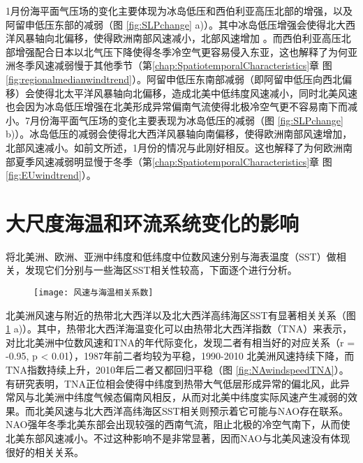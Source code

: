 1月份海平面气压场的变化主要体现为冰岛低压和西伯利亚高压北部的增强，以及阿留申低压东部的减弱（图 \ref{fig:SLPchange} a)）。其中冰岛低压增强会使得北大西洋风暴轴向北偏移，使得欧洲南部风速减小，北部风速增加 \citep{lifland2003the}。而西伯利亚高压北部增强配合日本以北气压下降使得冬季冷空气更容易侵入东亚，这也解释了为何亚洲冬季风速减弱慢于其他季节（第\ref{chap:SpatiotemporalCharacteristics}章 图 \ref{fig:regionalmedianwindtrend}）。阿留申低压东南部减弱（即阿留申低压向西北偏移）会使得北太平洋风暴轴向北偏移，造成北美中低纬度风速减小\citep{任雪娟2007北太平洋风暴轴的变异特征及其与中纬度海气耦合关系分析}，同时北美风速也会因为冰岛低压增强在北美形成异常偏南气流使得北极冷空气更不容易南下而减小。7月份海平面气压场的变化主要表现为冰岛低压的减弱（图 \ref{fig:SLPchange} b)）。冰岛低压的减弱会使得北大西洋风暴轴向南偏移，使得欧洲南部风速增加，北部风速减小。如前文所述，1月份的情况与此刚好相反。这也解释了为何欧洲南部夏季风速减弱明显慢于冬季（第\ref{chap:SpatiotemporalCharacteristics}章 图 \ref{fig:EUwindtrend}）。

\section{大尺度海温和环流系统变化的影响}

将北美洲、欧洲、亚洲中纬度和低纬度中位数风速分别与海表温度（SST）做相关，发现它们分别与一些海区SST相关性较高，下面逐个进行分析。

\begin{figure}[!htbp]
    \centering
    \texttt{[image: 风速与海温相关系数]}
    \label{fig:windspeedcorrSST}
\end{figure}

北美洲风速与附近的热带北大西洋以及北大西洋高纬海区SST有显著相关关系（图 \ref{fig:windspeedcorrSST} a)）。其中，热带北大西洋海温变化可以由热带北大西洋指数（TNA）来表示，对比北美洲中位数风速和TNA的年代际变化，发现二者有相当好的对应关系（r = -0.95, p < 0.01），1987年前二者均较为平稳，1990-2010 北美洲风速持续下降，而TNA指数持续上升，2010年后二者又都回归平稳（图 \ref{fig:NAwindspeedTNA}）。有研究表明，TNA正位相会使得中纬度到热带大气低层形成异常的偏北风，此异常风与北美洲中纬度气候态偏南风相反，从而对北美中纬度实际风速产生减弱的效果\citep{wang2002atlantic}。而北美风速与北大西洋高纬海区SST相关则预示着它可能与NAO存在联系。NAO强年冬季北美东部会出现较强的西南气流，阻止北极的冷空气南下，从而使北美东部风速减小。不过这种影响不是非常显著，因而NAO与北美风速没有体现很好的相关关系。

